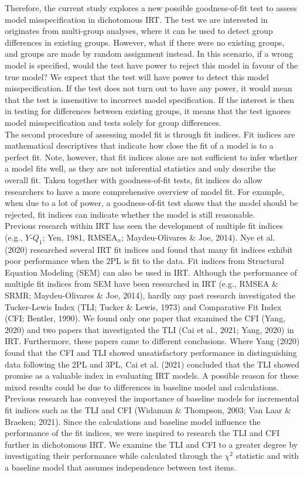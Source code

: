 \documentclass[Royal,sageapa,times,doublespace]{sagej}
\begin{document}
\indent Therefore, the current study explores a new possible goodness-of-fit test to assess model misspecification in dichotomous IRT. The test we are interested in originates from multi-group analyses, where it can be used to detect group differences in existing groups. However, what if there were no existing groups, and groups are made by random assignment instead. In this scenario, if a wrong model is specified, would the test have power to reject this model in favour of the true model? We expect that the test will have power to detect this model misspecification. If the test does not turn out to have any power, it would mean that the test is insensitive to incorrect model specification. If the interest is then in testing for differences between existing groups, it means that the test ignores model misspecification and tests solely for group differences. \\
\indent The second procedure of assessing model fit is through fit indices. Fit indices are mathematical descriptives that indicate how close the fit of a model is to a perfect fit. Note, however, that fit indices alone are not sufficient to infer whether a model fits well, as they are not inferential statistics and only describe the overall fit. Taken together with goodness-of-fit tests, fit indices do allow researchers to have a more comprehensive overview of model fit. For example, when due to a lot of power, a goodness-of-fit test shows that the model should be rejected, fit indices can indicate whether the model is still reasonable. \\ 
\indent Previous research within IRT has seen the development of multiple fit indices (e.g., $Y\text{-}Q_1$; Yen, 1981, $\text{RMSEA}_n$; Maydeu-Olivares \& Joe, 2014). Nye et al. (2020) researched several IRT fit indices and found that many fit indices exhibit poor performance when the 2PL is fit to the data. Fit indices from Structural Equation Modeling (SEM) can also be used in IRT. Although the performance of multiple fit indices from SEM have been researched in IRT (e.g., RMSEA \& SRMR; Maydeu-Olivares \& Joe, 2014), hardly any past research investigated the Tucker-Lewis Index (TLI; Tucker \& Lewis, 1973) and Comparative Fit Index (CFI; Bentler, 1990). We found only one paper that examined the CFI (Yang, 2020) and two papers that investigated the TLI (Cai et al., 2021; Yang, 2020) in IRT. Furthermore, these papers came to different conclusions. Where Yang (2020) found that the CFI and TLI showed unsatisfactory performance in distinguishing data following the 2PL and 3PL, Cai et al. (2021) concluded that the TLI showed promise as a valuable index in evaluating IRT models. A possible reason for these mixed results could be due to differences in baseline model and calculations. Previous research has conveyed the importance of baseline models for incremental fit indices such as the TLI and CFI (Widaman \& Thompson, 2003; Van Laar \& Braeken; 2021). Since the calculations and baseline model influence the performance of the fit indices, we were inspired to research the TLI and CFI further in dichotomous IRT. We examine the TLI and CFI to a greater degree by investigating their performance while calculated through the $\chi^2$ statistic and with a baseline model that assumes independence between test items. \\
\end{document}
